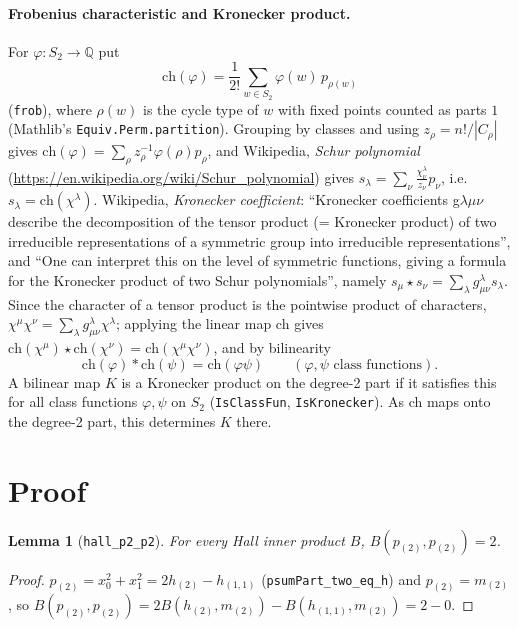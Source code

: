 \documentclass[11pt]{article}
\newtheorem{lemma}[theorem]{Lemma}
\theoremstyle{remark}
\newcommand{\tl}{\texttt}
\begin{document}
\paragraph{Frobenius characteristic and Kronecker product.} For $\varphi:S_2\to\mathbb{Q}$ put
\[ \mathrm{ch}(\varphi)=\frac1{2!}\sum_{w\in S_2}\varphi(w)\,p_{\rho(w)} \]
(\tl{frob}), where $\rho(w)$ is the cycle type of $w$ with fixed points counted as parts $1$
(Mathlib's \tl{Equiv.Perm.partition}). Grouping by classes and using $z_\rho=n!/|C_\rho|$ gives
$\mathrm{ch}(\varphi)=\sum_\rho z_\rho^{-1}\varphi(\rho)p_\rho$, and Wikipedia, \emph{Schur
polynomial} (\url{https://en.wikipedia.org/wiki/Schur_polynomial}) gives
$s_\lambda=\sum_\nu \frac{\chi^\lambda_\nu}{z_\nu}p_\nu$, i.e.\ $s_\lambda=\mathrm{ch}(\chi^\lambda)$.
Wikipedia, \emph{Kronecker coefficient}: ``Kronecker coefficients g$\lambda\mu\nu$ describe the
decomposition of the tensor product (= Kronecker product) of two irreducible representations of a
symmetric group into irreducible representations'', and ``One can interpret this on the level of
symmetric functions, giving a formula for the Kronecker product of two Schur polynomials'',
namely $s_\mu\star s_\nu=\sum_\lambda g^\lambda_{\mu\nu}s_\lambda$. Since the character of a tensor
product is the pointwise product of characters, $\chi^\mu\chi^\nu=\sum_\lambda
g^\lambda_{\mu\nu}\chi^\lambda$; applying the linear map ch gives
$\mathrm{ch}(\chi^\mu)\star\mathrm{ch}(\chi^\nu)=\mathrm{ch}(\chi^\mu\chi^\nu)$, and by
bilinearity
\[ \mathrm{ch}(\varphi) * \mathrm{ch}(\psi) = \mathrm{ch}(\varphi\psi)\qquad
(\varphi,\psi \text{ class functions}). \]
A bilinear map $K$ is a Kronecker product on the degree-2 part if it satisfies this for all class
functions $\varphi,\psi$ on $S_2$ (\tl{IsClassFun}, \tl{IsKronecker}). As ch maps onto the degree-2
part, this determines $K$ there.

\section{Proof}

\begin{lemma}[\tl{hall\_p2\_p2}]
For every Hall inner product $B$, $B(p_{(2)},p_{(2)})=2$.
\end{lemma}
\begin{proof}
$p_{(2)}=x_0^2+x_1^2=2h_{(2)}-h_{(1,1)}$ (\tl{psumPart\_two\_eq\_h}) and $p_{(2)}=m_{(2)}$, so
$B(p_{(2)},p_{(2)})=2B(h_{(2)},m_{(2)})-B(h_{(1,1)},m_{(2)})=2-0$.
\end{proof}
\end{document}
